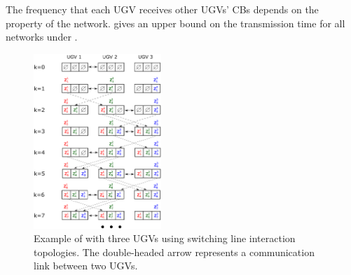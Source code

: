 	\begin{rem} 
		The frequency that each UGV receives other UGVs' CBs depends on the property of the network.
		 gives an upper bound on the transmission time for all {\fc} networks under {\proto}.
	\end{rem}
	
	
	
	\begin{figure}%
		\centering
		\includegraphics[width=0.43\textwidth]{figures/data_exchange_switch}
		\caption{Example of \proto with three UGVs using switching line interaction topologies. The double-headed arrow represents a communication link between two UGVs.}
		\label{fig:\proto}
	\end{figure}		